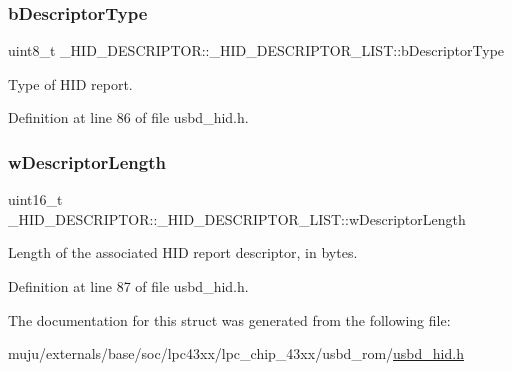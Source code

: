 \subsubsection{\texorpdfstring{b\+Descriptor\+Type}{bDescriptorType}}
{\footnotesize\ttfamily uint8\+\_\+t \+\_\+\+H\+I\+D\+\_\+\+D\+E\+S\+C\+R\+I\+P\+T\+O\+R\+::\+\_\+\+H\+I\+D\+\_\+\+D\+E\+S\+C\+R\+I\+P\+T\+O\+R\+\_\+\+L\+I\+S\+T\+::b\+Descriptor\+Type}

Type of H\+ID report. 

Definition at line 86 of file usbd\+\_\+hid.\+h.

\mbox{\label{struct___h_i_d___d_e_s_c_r_i_p_t_o_r_1_1___h_i_d___d_e_s_c_r_i_p_t_o_r___l_i_s_t_ad367e538b51883805ae462a047546ee7}} 
\subsubsection{\texorpdfstring{w\+Descriptor\+Length}{wDescriptorLength}}
{\footnotesize\ttfamily uint16\+\_\+t \+\_\+\+H\+I\+D\+\_\+\+D\+E\+S\+C\+R\+I\+P\+T\+O\+R\+::\+\_\+\+H\+I\+D\+\_\+\+D\+E\+S\+C\+R\+I\+P\+T\+O\+R\+\_\+\+L\+I\+S\+T\+::w\+Descriptor\+Length}

Length of the associated H\+ID report descriptor, in bytes. 

Definition at line 87 of file usbd\+\_\+hid.\+h.



The documentation for this struct was generated from the following file\+:\begin{DoxyCompactItemize}
\item 
muju/externals/base/soc/lpc43xx/lpc\+\_\+chip\+\_\+43xx/usbd\+\_\+rom/\hyperlink{usbd__hid_8h}{usbd\+\_\+hid.\+h}\end{DoxyCompactItemize}
